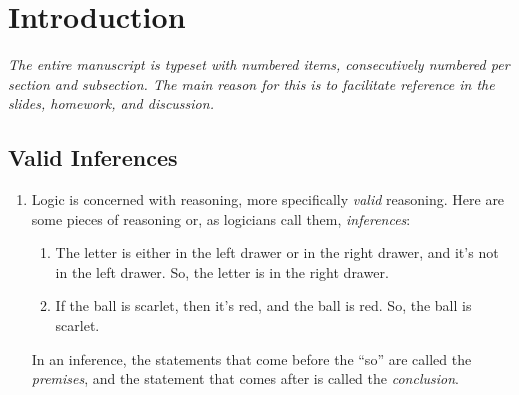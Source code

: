 \chapter{Introduction}
\label{chapter:intro}

\emph{The entire manuscript is typeset with numbered items, consecutively numbered per section and subsection. The main reason for this is to facilitate reference in the slides, homework, and discussion.}

\section{Valid Inferences}
\label{intro:valid}

\begin{enumerate}[\thesection.1]

\item Logic is concerned with reasoning, more specifically
  \emph{valid} reasoning. Here are some pieces of reasoning or, as logicians call them, \emph{inferences}:	
		
	\begin{enumerate}[(1)]
	
		\item The letter is either in the left drawer or in the right drawer, and it's not in the left drawer. So, the letter is in the right drawer.
		
		\item If the ball is scarlet, then it's red, and the ball is red. So, the ball is scarlet. 
					
	\end{enumerate}
	In an inference, the statements that come before the ``so'' are called the \emph{premises}, and the statement that comes after is called the \emph{conclusion}.
	

\end{enumerate}
